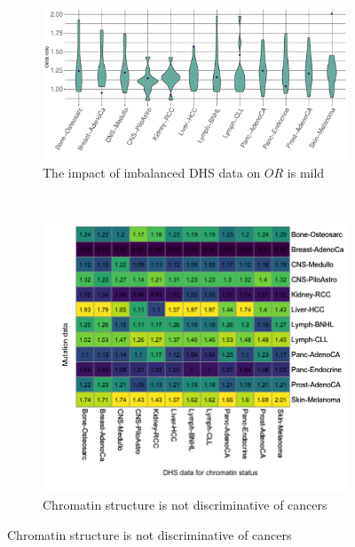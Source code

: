 \begin{figure}[htbp]
    \begin{subfigure}{\textwidth}
    \centering
    \includegraphics[scale=0.55]{graphics/mixed_or_violin.pdf}
    \caption{The impact of imbalanced DHS data on $OR$ is mild}
    \label{fig:mixed_or_violin}
    \end{subfigure} \\
    
    \vspace{0.2cm}
    \begin{subfigure}{\textwidth}
    \centering
    \includegraphics[scale=0.58]{graphics/mixed_or_heatmap.png}
    \caption{Chromatin structure is not discriminative of cancers}
    \label{fig:mixed_or_heatmap}
    \end{subfigure} 


\end{figure}
